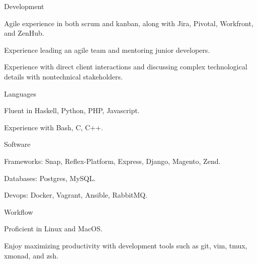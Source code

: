 \begin{cvskills}
  \cvskill
    {Development}
    {\begin{cvitems}
        \item Agile experience in both scrum and kanban, along with Jira, Pivotal, Workfront, and ZenHub.
        \item Experience leading an agile team and mentoring junior developers.
        \item Experience with direct client interactions and
          discussing complex technological details with nontechnical stakeholders.
     \end{cvitems}}
  \cvskill
    {Languages}
    {\begin{cvitems}
        \item Fluent in Haskell, Python, PHP, Javascript.
        \item Experience with Bash, C, C++.
     \end{cvitems}}
  \cvskill
    {Software}
    {\begin{cvitems}
        \item Frameworks: Snap, Reflex-Platform, Express, Django, Magento, Zend.
        \item Databases: Postgres, MySQL.
        \item Devops: Docker, Vagrant, Ansible, RabbitMQ.
     \end{cvitems}}
  \cvskill
    {Workflow}
    {\begin{cvitems}
        \item Proficient in Linux and MacOS.
        \item Enjoy maximizing productivity with development tools such as
          git, vim, tmux, xmonad, and zsh.
     \end{cvitems}}
\end{cvskills}
